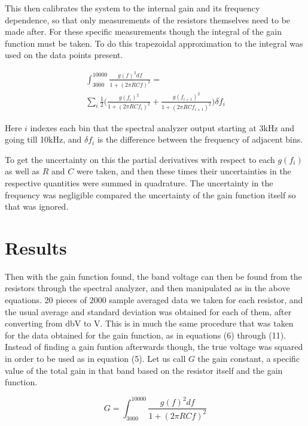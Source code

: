 \documentclass[aps,twocolumn,preprintnumbers]{revtex4}
\begin{document}
This then calibrates the system to the internal gain and its frequency dependence, so that only measurements of the resistors themselves need to be made after. For these specific measurements though the integral of the gain function must be taken. To do this trapezoidal approximation to the integral was used on the data points present. 

\begin{gather}
    \int_{3000}^{10000} \frac{g(f)^2 df}{1 + (2\pi RCf)^2} =
    \nonumber
    \\
    \sum_i \frac{1}{2} \bigg( \frac{g(f_i)^2 }{1 + (2\pi RCf_i)^2} + \frac{g(f_{i+1})^2 }{1 + (2\pi RCf_{i+1})^2} \bigg) \delta f_i 
\end{gather}

Here $i$ indexes each bin that the spectral analyzer output starting at 3kHz and going till 10kHz, and $\delta f_i$ is the difference between the frequency of adjacent bins. 

To get the uncertainty on this the partial derivatives with respect to each $g(f_i)$ as well as $R$ and $C$ were taken, and then these times their uncertainties in the respective quantities were summed in quadrature. The uncertainty in the frequency was negligible compared the uncertainty of the gain function itself so that was ignored. 



\section{Results}

Then with the gain function found, the band voltage can then be found from the resistors through the spectral analyzer, and then manipulated as in the above equations. 20 pieces of 2000 sample averaged data we taken for each resistor, and the usual average and standard deviation was obtained for each of them, after converting from dbV to V. This is in much the same procedure that was taken for the data obtained for the gain function, as in equations (6) through (11). Instead of finding a gain funtion afterwards though, the true voltage was squared in order to be used as in equation (5). Let us call $G$ the gain constant, a specific value of the total gain in that band based on the resistor itself and the gain function. 

\begin{equation}
    G = \int_{3000}^{10000} \frac{g(f)^2 df}{1 + (2\pi RCf)^2}
\end{equation}
\end{document}
